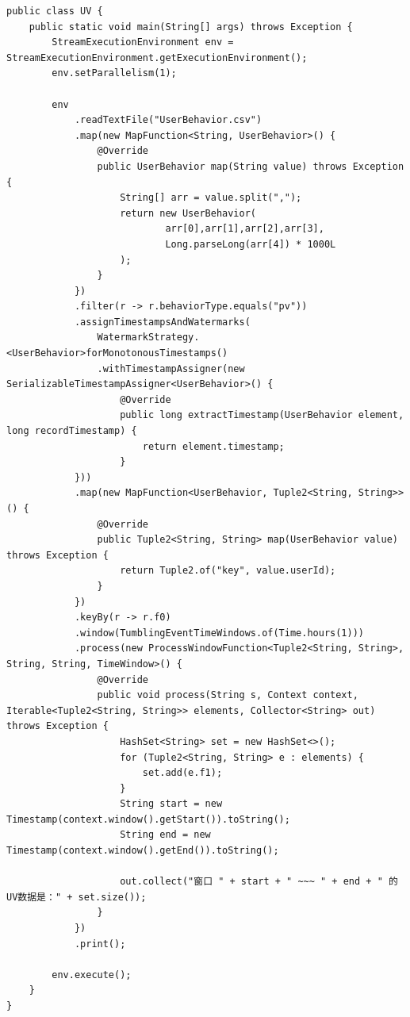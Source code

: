 \documentclass[cn,11pt,chinese]{elegantbook}
\begin{document}
\begin{verbatim}
public class UV {
    public static void main(String[] args) throws Exception {
        StreamExecutionEnvironment env = StreamExecutionEnvironment.getExecutionEnvironment();
        env.setParallelism(1);

        env
            .readTextFile("UserBehavior.csv")
            .map(new MapFunction<String, UserBehavior>() {
                @Override
                public UserBehavior map(String value) throws Exception {
                    String[] arr = value.split(",");
                    return new UserBehavior(
                            arr[0],arr[1],arr[2],arr[3],
                            Long.parseLong(arr[4]) * 1000L
                    );
                }
            })
            .filter(r -> r.behaviorType.equals("pv"))
            .assignTimestampsAndWatermarks(
                WatermarkStrategy.<UserBehavior>forMonotonousTimestamps()
                .withTimestampAssigner(new SerializableTimestampAssigner<UserBehavior>() {
                    @Override
                    public long extractTimestamp(UserBehavior element, long recordTimestamp) {
                        return element.timestamp;
                    }
            }))
            .map(new MapFunction<UserBehavior, Tuple2<String, String>>() {
                @Override
                public Tuple2<String, String> map(UserBehavior value) throws Exception {
                    return Tuple2.of("key", value.userId);
                }
            })
            .keyBy(r -> r.f0)
            .window(TumblingEventTimeWindows.of(Time.hours(1)))
            .process(new ProcessWindowFunction<Tuple2<String, String>, String, String, TimeWindow>() {
                @Override
                public void process(String s, Context context, Iterable<Tuple2<String, String>> elements, Collector<String> out) throws Exception {
                    HashSet<String> set = new HashSet<>();
                    for (Tuple2<String, String> e : elements) {
                        set.add(e.f1);
                    }
                    String start = new Timestamp(context.window().getStart()).toString();
                    String end = new Timestamp(context.window().getEnd()).toString();

                    out.collect("窗口 " + start + " ~~~ " + end + " 的UV数据是：" + set.size());
                }
            })
            .print();

        env.execute();
    }
}
\end{verbatim}
\end{document}

